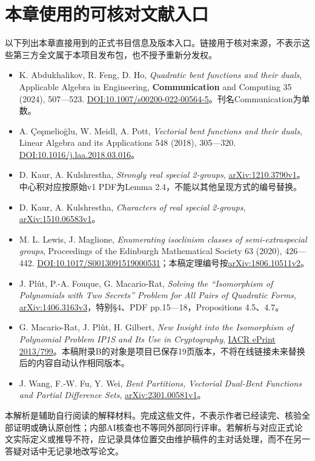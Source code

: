 \documentclass[UTF8,fontset=fandol,zihao=-4,openany,oneside]{ctexbook}
\begin{document}
\section{本章使用的可核对文献入口}


以下列出本章直接用到的正式书目信息及版本入口。链接用于核对来源，不表示这些第三方全文属于本项目发布包，也不授予重新分发权。



\begin{itemize}


\item K. Abdukhalikov, R. Feng, D. Ho, \emph{Quadratic bent functions and their duals}, Applicable Algebra in Engineering, \textbf{Communication} and Computing 35 (2024), 507—523. \href{https://doi.org/10.1007/s00200-022-00564-5}{DOI:10.1007/s00200-022-00564-5}。刊名Communication为单数。

\item A. Çeşmelioğlu, W. Meidl, A. Pott, \emph{Vectorial bent functions and their duals}, Linear Algebra and its Applications 548 (2018), 305—320. \href{https://doi.org/10.1016/j.laa.2018.03.016}{DOI:10.1016/j.laa.2018.03.016}。

\item D. Kaur, A. Kulshrestha, \emph{Strongly real special 2-groups}, \href{https://arxiv.org/abs/1210.3790v1}{arXiv:1210.3790v1}。中心积对应按原始v1 PDF为Lemma 2.4，不能以其他呈现方式的编号替换。

\item D. Kaur, A. Kulshrestha, \emph{Characters of real special 2-groups}, \href{https://arxiv.org/abs/1510.06583v1}{arXiv:1510.06583v1}。

\item M. L. Lewis, J. Maglione, \emph{Enumerating isoclinism classes of semi-extraspecial groups}, Proceedings of the Edinburgh Mathematical Society 63 (2020), 426—442. \href{https://doi.org/10.1017/S0013091519000531}{DOI:10.1017/S0013091519000531}；本稿定理编号按\href{https://arxiv.org/abs/1806.10511v2}{arXiv:1806.10511v2}。

\item J. Plût, P.-A. Fouque, G. Macario-Rat, \emph{Solving the “Isomorphism of Polynomials with Two Secrets” Problem for All Pairs of Quadratic Forms}, \href{https://arxiv.org/abs/1406.3163v3}{arXiv:1406.3163v3}，特别§4、PDF pp.15—18，Propositions 4.5、4.7。

\item G. Macario-Rat, J. Plût, H. Gilbert, \emph{New Insight into the Isomorphism of Polynomial Problem IP1S and Its Use in Cryptography}, \href{https://eprint.iacr.org/2013/799.pdf}{IACR ePrint 2013/799}。本稿附录B的对象是项目已保存19页版本，不将在线链接未来替换后的内容自动认作相同版本。

\item J. Wang, F.-W. Fu, Y. Wei, \emph{Bent Partitions, Vectorial Dual-Bent Functions and Partial Difference Sets}, \href{https://arxiv.org/abs/2301.00581v1}{arXiv:2301.00581v1}。

\end{itemize}


本解析是辅助自行阅读的解释材料。完成这些文件，不表示作者已经读完、核验全部证明或确认原创性；内部AI核查也不等同外部同行评审。若解析与对应正式论文实际定义或推导不符，应记录具体位置交由维护稿件的主对话处理，而不在另一答疑对话中无记录地改写论文。
\end{document}
